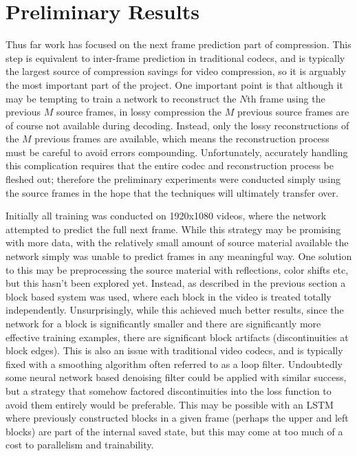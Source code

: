 \documentclass[10pt,twocolumn,letterpaper]{article}
\begin{document}
\section{Preliminary Results}

Thus far work has focused on the next frame prediction part of compression. This step is equivalent to inter-frame prediction in traditional codecs, and is typically the largest source of compression savings for video compression, so it is arguably the most important part of the project. One important point is that although it may be tempting to train a network to reconstruct the $N$th frame using the previous $M$ source frames, in lossy compression the $M$ previous source frames are of course not available during decoding. Instead, only the lossy reconstructions of the $M$ previous frames are available, which means the reconstruction process must be careful to avoid errors compounding. Unfortunately, accurately handling this complication requires that the entire codec and reconstruction process be fleshed out; therefore the preliminary experiments were conducted simply using the source frames in the hope that the techniques will ultimately transfer over.

Initially all training was conducted on 1920x1080 videos, where the network attempted to predict the full next frame. While this strategy may be promising with more data, with the relatively small amount of source material available the network simply was unable to predict frames in any meaningful way. One solution to this may be preprocessing the source material with reflections, color shifts etc, but this hasn't been explored yet. Instead, as described in the previous section a block based system was used, where each block in the video is treated totally independently. Unsurprisingly, while this achieved much better results, since the network for a block is significantly smaller and there are significantly more effective training examples, there are significant block artifacts (discontinuities at block edges). This is also an issue with traditional video codecs, and is typically fixed with a smoothing algorithm often referred to as a loop filter. Undoubtedly some neural network based denoising filter could be applied with similar success, but a strategy that somehow factored discontinuities into the loss function to avoid them entirely would be preferable. This may be possible with an LSTM where previously constructed blocks in a given frame (perhaps the upper and left blocks) are part of the internal saved state, but this may come at too much of a cost to parallelism and trainability.
\end{document}
